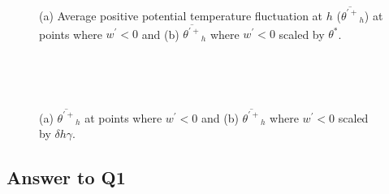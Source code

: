 \begin{figure}[htbp]
\begin{minipage}[b]{0.5\linewidth}
        \\
        \end{minipage}             
\quad
\begin{minipage}[b]{0.5\linewidth}
        \\      
       \end{minipage}
        \caption[Positive Potential Temperature Fluctuation at $h$ (i)]{(a) Average positive potential temperature fluctuation at $h$ ($\overline{\theta^{\prime+}}_{h}$) at points where $w^{\prime}<0$ and (b) $\overline{\theta^{\prime+}}_{h}$ where $w^{\prime}<0$ scaled by $\theta^{*}$.}
        \label{fig:downwarm_theta}
\end{figure}


\begin{figure}[htbp]
\begin{minipage}[b]{0.5\linewidth}
        \\
        \end{minipage}             
\quad
\begin{minipage}[b]{0.5\linewidth}
        \\      
       \end{minipage}
        \caption[Positive Potential Temperature Fluctuation at $h$ (ii)]{(a) $\overline{\theta^{\prime+}}_{h}$ at points where $w^{\prime}<0$ and (b) $\overline{\theta^{\prime+}}_{h}$ where $w^{\prime}<0$ scaled by $\delta h \gamma$.}
        \label{fig:downwarm_theta1}
\end{figure}
\clearpage
\subsection{Answer to Q1}

